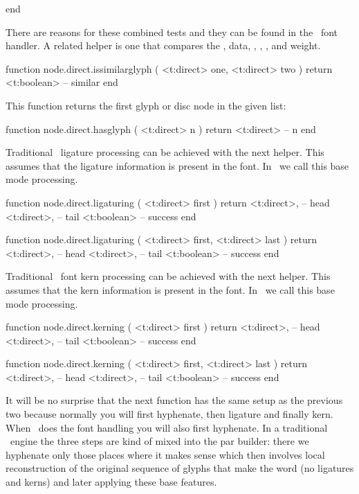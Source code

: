 end
\stoptyping

There are reasons for these combined tests and they can be found in the \CONTEXT\
font handler. A related helper is one that compares the , \type
{data}, \type {scale}, \type {xscale}, \type {yscale}, \type {slant} and \type
{weight}.

\starttyping[option=LUA]
function node.direct.issimilarglyph ( <t:direct>  one, <t:direct> two )
    return <t:boolean> -- similar
end
\stoptyping

This function returns the first glyph or disc node in the given list:

\starttyping[option=LUA]
function node.direct.hasglyph ( <t:direct> n )
    return <t:direct> -- n
end
\stoptyping

Traditional \TEX\ ligature processing can be achieved with the next helper. This
assumes that the ligature information is present in the font. In \CONTEXT\ we
call this base mode processing.

\starttyping[option=LUA]
function node.direct.ligaturing ( <t:direct> first )
    return
        <t:direct>, -- head
        <t:direct>, -- tail
        <t:boolean> -- success
end

function node.direct.ligaturing ( <t:direct> first, <t:direct> last )
    return
        <t:direct>, -- head
        <t:direct>, -- tail
        <t:boolean> -- success
end
\stoptyping

Traditional \TEX\ font kern processing can be achieved with the next helper. This
assumes that the kern information is present in the font. In \CONTEXT\ we
call this base mode processing.

\starttyping[option=LUA]
function node.direct.kerning ( <t:direct> first )
    return
        <t:direct>, -- head
        <t:direct>, -- tail
        <t:boolean> -- success
end

function node.direct.kerning ( <t:direct> first, <t:direct> last )
    return
        <t:direct>, -- head
        <t:direct>, -- tail
        <t:boolean> -- success
end
\stoptyping

It will be no surprise that the next function has the same setup as the previous
two because normally you will first hyphenate, then ligature and finally kern.
When \LUA\ does the font handling you will also first hyphenate. In a traditional
\TEX\ engine the three steps are kind of mixed into the par builder: there we
hyphenate only those places where it makes sense which then involves local
reconstruction of the original sequence of glyphs that make the word (no
ligatures and kerns) and later applying these base features.

